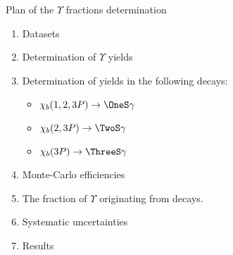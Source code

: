 \begin{frame}{Plan of the $\Upsilon$ fractions determination}
\begin{enumerate}
\item Datasets
\item Determination of $\Upsilon$ yields
\item Determination of \chib yields in the following decays:
\begin{itemize}
    \item $\chi_b(1,2,3P) \to \OneS \gamma$
    \item $\chi_b(2,3P) \to \TwoS \gamma$
    \item $\chi_b(3P) \to \ThreeS \gamma$
\end{itemize}
\item Monte-Carlo efficiencies
\item The fraction of $\Upsilon$ originating from \chib decays.
\item Systematic uncertainties 
\item Results
\end{enumerate}
\end{frame}
